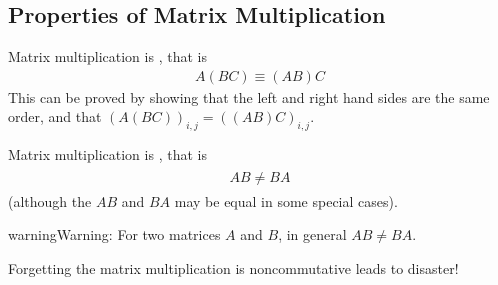 \documentclass[letterpaper,10pt,english]{jupyterBook}
\begin{document}
\subsection{Properties of Matrix Multiplication}
\label{\detokenize{LinearAlgebra/linear_systems_matrices/matrices:properties-of-matrix-multiplication}}
\sphinxAtStartPar
Matrix multiplication is , that is
\begin{equation*}
\begin{split}A (B C)\equiv (A B)C\end{split}
\end{equation*}
\sphinxAtStartPar
This can be proved by showing that the left and right hand sides are the same order, and that \((A(B C))_{i,j}=((A B)C)_{i,j}\).

\sphinxAtStartPar
Matrix multiplication is , that is
\begin{equation*}
\begin{split}\begin{array}{c}A B\neq B A \end{array}\end{split}
\end{equation*}
\sphinxAtStartPar
(although the  \(AB\) and \(BA\) may be equal in some special cases).

\begin{sphinxadmonition}{warning}{Warning:}
\sphinxAtStartPar
For two matrices \(A\) and \(B\), in general \(AB \neq BA\).

\sphinxAtStartPar
Forgetting the matrix multiplication is non\sphinxhyphen{}commutative leads to disaster!
\end{sphinxadmonition}
\end{document}
